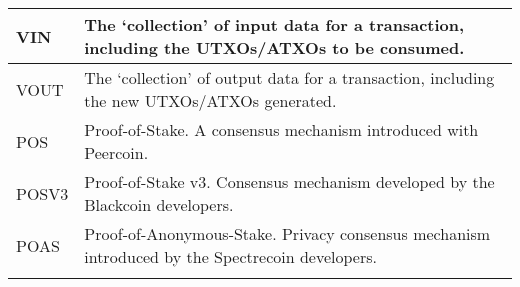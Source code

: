 \begin{table}[h]
{\begin{tabular}{@{}ll@{}}
VIN & The ‘collection’ of input data for a transaction, including the UTXOs/ATXOs to be consumed. \\ \midrule
VOUT & The ‘collection’ of output data for a transaction, including the new UTXOs/ATXOs generated. \\ \midrule
POS & Proof-of-Stake. A consensus mechanism introduced with Peercoin. \\ \midrule
POSV3 & Proof-of-Stake v3. Consensus mechanism developed by the Blackcoin developers. \\ \midrule
POAS & Proof-of-Anonymous-Stake. Privacy consensus mechanism introduced by the Spectrecoin developers. \\ \midrule
& 
\end{tabular}%
}
\end{table}